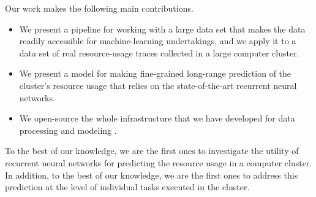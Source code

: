 Our work makes the following main contributions.
\begin{itemize}
\item We present a pipeline for working with a large data set that makes the
data readily accessible for machine-learning undertakings, and we apply it to a
data set of real resource-usage traces collected in a large computer cluster.

\item We present a model for making fine-grained long-range prediction of the
cluster's resource usage that relies on the state-of-the-art recurrent neural
networks.

\item We open-source the whole infrastructure that we have developed for data
processing and modeling \cite{sources}.
\end{itemize}

To the best of our knowledge, we are the first ones to investigate the utility
of recurrent neural networks for predicting the resource usage in a computer
cluster. In addition, to the best of our knowledge, we are the first ones to
address this prediction at the level of individual tasks executed in the
cluster.
